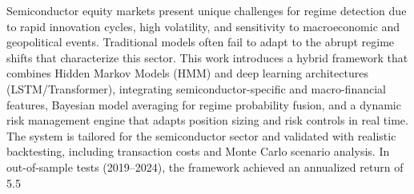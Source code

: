 Semiconductor equity markets present unique challenges for regime detection due to rapid innovation cycles, high volatility, and sensitivity to macroeconomic and geopolitical events. Traditional models often fail to adapt to the abrupt regime shifts that characterize this sector. This work introduces a hybrid framework that combines Hidden Markov Models (HMM) and deep learning architectures (LSTM/Transformer), integrating semiconductor-specific and macro-financial features, Bayesian model averaging for regime probability fusion, and a dynamic risk management engine that adapts position sizing and risk controls in real time. The system is tailored for the semiconductor sector and validated with realistic backtesting, including transaction costs and Monte Carlo scenario analysis. In out-of-sample tests (2019–2024), the framework achieved an annualized return of 5.5%
